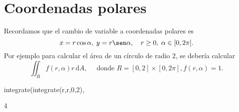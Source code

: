 
\section{Coordenadas polares}
Recordamos que el cambio de variable a coordenadas polares es
\begin{equation*}
 x=r\cos\alpha,
 \;
 y=r\sen\alpha,
 \quad
 r\geq0,
 \;
 \alpha\in[0,2\pi].
\end{equation*}
Por ejemplo para calcular el área de un círculo de radio $2$,
se debería calcular
\begin{equation*}
 \iint_{R} f(r,\alpha)r\,\mathrm{d}A,
 \quad
 \text{ donde }
 R = [0,2]\times[0,2\pi],
 f(r,\alpha) = 1.
\end{equation*}
\begin{maximai}
 integrate(integrate(r,r,0,2), %
\end{maximai}\begin{maximao}
 4\pi
\end{maximao}
